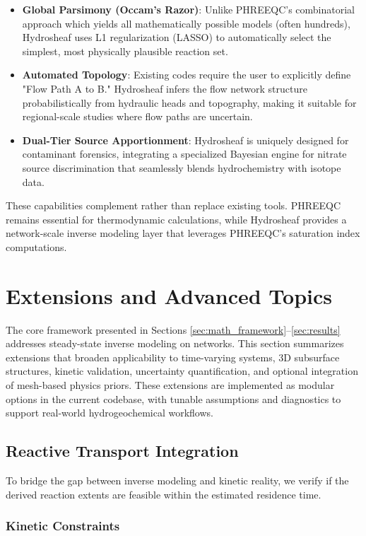 \documentclass[12pt,a4paper]{article}
\theoremstyle{plain}
\theoremstyle{definition}
\theoremstyle{remark}
\begin{document}
\begin{itemize}
	\item \textbf{Global Parsimony (Occam's Razor)}: Unlike PHREEQC's combinatorial approach which yields all mathematically possible models (often hundreds), Hydrosheaf uses L1 regularization (LASSO) to automatically select the simplest, most physically plausible reaction set.
	\item \textbf{Automated Topology}: Existing codes require the user to explicitly define "Flow Path A to B." Hydrosheaf infers the flow network structure probabilistically from hydraulic heads and topography, making it suitable for regional-scale studies where flow paths are uncertain.
	\item \textbf{Dual-Tier Source Apportionment}: Hydrosheaf is uniquely designed for contaminant forensics, integrating a specialized Bayesian engine for nitrate source discrimination that seamlessly blends hydrochemistry with isotope data.
\end{itemize}

These capabilities complement rather than replace existing tools. PHREEQC remains essential for thermodynamic calculations, while Hydrosheaf provides a network-scale inverse modeling layer that leverages PHREEQC's saturation index computations.
\newpage
\section{Extensions and Advanced Topics}\label{sec:extensions}

The core framework presented in Sections \ref{sec:math_framework}--\ref{sec:results} addresses steady-state inverse modeling on networks. This section summarizes extensions that broaden applicability to time-varying systems, 3D subsurface structures, kinetic validation, uncertainty quantification, and optional integration of mesh-based physics priors. These extensions are implemented as modular options in the current codebase, with tunable assumptions and diagnostics to support real-world hydrogeochemical workflows.

\subsection{Reactive Transport Integration}

To bridge the gap between inverse modeling and kinetic reality, we verify if the derived reaction extents are feasible within the estimated residence time.

\subsubsection{Kinetic Constraints}
\end{document}
